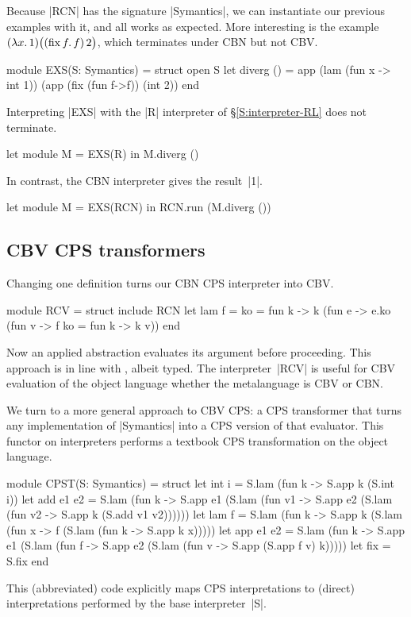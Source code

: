 Because |RCN| has the signature |Symantics|, we can instantiate our previous
examples with it, and all works as expected.  More interesting
is the example $(\mathopen{\lambda\mathord{x}.\,}1)\bigl((\mathopen{\mathrm{fix\,}\mathord{f}.\,}f)\mathinner2\bigr)$, which terminates
under CBN but not CBV\@.
\begin{code}
module EXS(S: Symantics) = struct open S
 let diverg () = app (lam (fun x -> int 1)) 
                     (app (fix (fun f->f)) (int 2))
end
\end{code}
Interpreting |EXS| with the |R| interpreter of
\S\ref{S:interpreter-RL} does not terminate.
\begin{code}
let module M = EXS(R) in M.diverg ()
\end{code}
In contrast, the CBN interpreter gives the result~|1|.
\begin{code}
let module M = EXS(RCN) in RCN.run (M.diverg ())
\end{code}

\subsection{CBV CPS transformers}

Changing one definition turns our CBN CPS interpreter into CBV\@.
\begin{code}
module RCV = struct include RCN
  let lam f = {ko = fun k -> k
      (fun e -> e.ko (fun v -> f {ko = fun k -> k v}))}
end
\end{code}
Now an applied abstraction
evaluates its argument before proceeding. This approach is in
line with , albeit typed. The
interpreter~|RCV| is useful for CBV evaluation of the object language
whether the metalanguage is CBV or CBN\@.

We turn to a more general approach to CBV CPS: a CPS transformer that
turns any implementation of |Symantics| into a CPS version of that
evaluator.
This functor on interpreters performs a textbook
CPS transformation on the object language.
\begin{code}
module CPST(S: Symantics) = struct
  let int i = S.lam (fun k -> S.app k (S.int i))
  let add e1 e2 = S.lam (fun k -> S.app e1 (S.lam (fun v1 ->
                                  S.app e2 (S.lam (fun v2 ->
                                  S.app k (S.add v1 v2))))))
  let lam f = S.lam (fun k -> S.app k
              (S.lam (fun x -> f (S.lam (fun k -> S.app k x)))))
  let app e1 e2 = S.lam (fun k -> S.app e1 (S.lam (fun f ->
                                  S.app e2 (S.lam (fun v ->
                                  S.app (S.app f v) k)))))
  let fix = S.fix
end
\end{code}
This (abbreviated) code explicitly maps CPS interpretations to
(direct) interpretations performed by 
the base interpreter~|S|.

